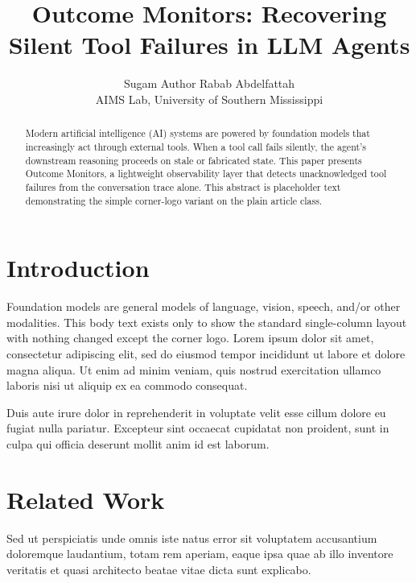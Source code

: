 \documentclass[11pt]{article}
\title{\vspace{-2.5em}Outcome Monitors: Recovering Silent Tool Failures in LLM Agents}
\author{Sugam Author \quad Rabab Abdelfattah\\
  AIMS Lab, University of Southern Mississippi}
\date{}
\begin{document}
\aimscornerlogo
\maketitle

\begin{abstract}
Modern artificial intelligence (AI) systems are powered by foundation models
that increasingly act through external tools. When a tool call fails
silently, the agent's downstream reasoning proceeds on stale or fabricated
state. This paper presents Outcome Monitors, a lightweight observability
layer that detects unacknowledged tool failures from the conversation trace
alone. This abstract is placeholder text demonstrating the simple corner-logo
variant on the plain article class.
\end{abstract}

\section{Introduction}

Foundation models are general models of language, vision, speech, and/or
other modalities. This body text exists only to show the standard single-column layout
with nothing changed except the corner logo. Lorem ipsum dolor sit amet,
consectetur adipiscing elit, sed do eiusmod tempor incididunt ut labore et
dolore magna aliqua. Ut enim ad minim veniam, quis nostrud exercitation
ullamco laboris nisi ut aliquip ex ea commodo consequat.

Duis aute irure dolor in reprehenderit in voluptate velit esse cillum dolore
eu fugiat nulla pariatur. Excepteur sint occaecat cupidatat non proident,
sunt in culpa qui officia deserunt mollit anim id est laborum.

\section{Related Work}

Sed ut perspiciatis unde omnis iste natus error sit voluptatem accusantium
doloremque laudantium, totam rem aperiam, eaque ipsa quae ab illo inventore
veritatis et quasi architecto beatae vitae dicta sunt explicabo.
\end{document}
